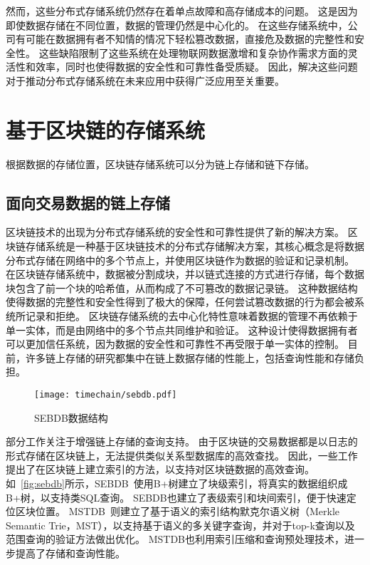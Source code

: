 然而，这些分布式存储系统仍然存在着单点故障和高存储成本的问题。
这是因为即使数据存储在不同位置，数据的管理仍然是中心化的。
在这些存储系统中，公司有可能在数据拥有者不知情的情况下轻松篡改数据，直接危及数据的完整性和安全性。
这些缺陷限制了这些系统在处理物联网数据激增和复杂协作需求方面的灵活性和效率，同时也使得数据的安全性和可靠性备受质疑。
因此，解决这些问题对于推动分布式存储系统在未来应用中获得广泛应用至关重要。

\section{基于区块链的存储系统}
根据数据的存储位置，区块链存储系统可以分为链上存储和链下存储。

\subsection{面向交易数据的链上存储}
区块链技术的出现为分布式存储系统的安全性和可靠性提供了新的解决方案。
区块链存储系统是一种基于区块链技术的分布式存储解决方案，其核心概念是将数据分布式存储在网络中的多个节点上，并使用区块链作为数据的验证和记录机制。
在区块链存储系统中，数据被分割成块，并以链式连接的方式进行存储，每个数据块包含了前一个块的哈希值，从而构成了不可篡改的数据记录链。
这种数据结构使得数据的完整性和安全性得到了极大的保障，任何尝试篡改数据的行为都会被系统所记录和拒绝。
区块链存储系统的去中心化特性意味着数据的管理不再依赖于单一实体，而是由网络中的多个节点共同维护和验证。
这种设计使得数据拥有者可以更加信任系统，因为数据的安全性和可靠性不再受限于单一实体的控制。
目前，许多链上存储的研究都集中在链上数据存储的性能上，包括查询性能和存储负担。

\begin{figure}[t]
    \centering
    \texttt{[image: timechain/sebdb.pdf]}
    \caption{SEBDB数据结构}
    \label{fig:sebdb}
\end{figure}

部分工作关注于增强链上存储的查询支持。
由于区块链的交易数据都是以日志的形式存储在区块链上，无法提供类似关系型数据库的高效查找。
因此，一些工作提出了在区块链上建立索引的方法，以支持对区块链数据的高效查询。
如~\autoref{fig:sebdb}所示，SEBDB~\cite{zhu2019sebdb}使用B+树建立了块级索引，将真实的数据组织成B+树，以支持类SQL查询。
SEBDB也建立了表级索引和块间索引，便于快速定位区块位置。
MSTDB~\cite{zhou2022mstdb}则建立了基于语义的索引结构默克尔语义树（Merkle Semantic Trie，MST），以支持基于语义的多关键字查询，并对于top-k查询以及范围查询的验证方法做出优化。
MSTDB也利用索引压缩和查询预处理技术，进一步提高了存储和查询性能。

